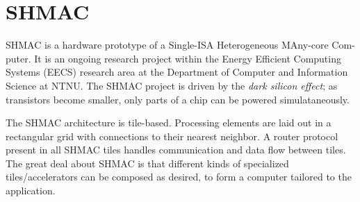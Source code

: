 \section{SHMAC}

SHMAC is a hardware prototype of a Single-ISA Heterogeneous MAny-core Com-
puter. It is an ongoing research project within the Energy Efficient Computing
Systems (EECS) research area at the Department of Computer and Information
Science at NTNU. The SHMAC project is driven by the \textit{dark silicon
effect}; as transistors become smaller, only parts of a chip can be powered
simulataneously.

The SHMAC architecture is tile-based. Processing elements are laid out in a
rectangular grid with connections to their nearest neighbor. A router protocol
present in all SHMAC tiles handles communication and data flow between tiles.
The great deal about SHMAC is that different kinds of specialized
tiles/accelerators can be composed as desired, to form a computer tailored to
the application.
